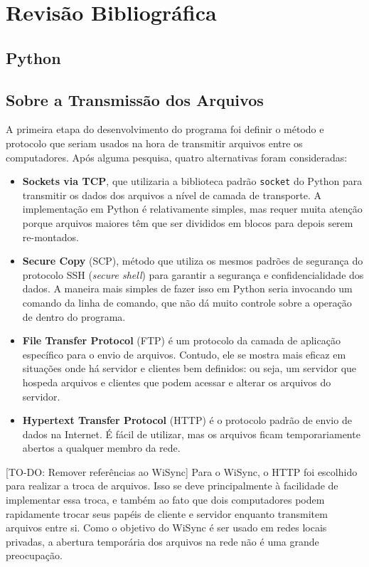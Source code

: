 \chapter{Revisão Bibliográfica}
\label{revisao}

\section{Python}

\section{Sobre a Transmissão dos Arquivos}
A primeira etapa do desenvolvimento do programa foi definir o método e protocolo que seriam usados na hora de transmitir arquivos entre os computadores.
Após alguma pesquisa, quatro alternativas foram consideradas: 
\begin{itemize}
  \item \textbf{Sockets via TCP}\cite{cerf2005protocol}, que utilizaria a biblioteca padrão \texttt{socket} do Python\cite{pythonsockets} para transmitir os dados dos arquivos a nível de camada de transporte. A implementação em Python é relativamente simples, mas requer muita atenção porque arquivos maiores têm que ser divididos em blocos para depois serem re-montados.
  \item \textbf{Secure Copy} (SCP), método que utiliza os mesmos padrões de segurança do protocolo SSH (\textit{secure shell}) para garantir a segurança e confidencialidade dos dados. A maneira mais simples de fazer isso em Python seria invocando um comando da linha de comando, que não dá muito controle sobre a operação de dentro do programa.
  \item \textbf{File Transfer Protocol}\cite{rfc959} (FTP) é um protocolo da camada de aplicação específico para o envio de arquivos. Contudo, ele se mostra mais eficaz em situações onde há servidor e clientes bem definidos: ou seja, um servidor que hospeda arquivos e clientes que podem acessar e alterar os arquivos do servidor.
  \item \textbf{Hypertext Transfer Protocol}\cite{rfc2068} (HTTP) é o protocolo padrão de envio de dados na Internet. É fácil de utilizar, mas os arquivos ficam temporariamente abertos a qualquer membro da rede.
\end{itemize}

[TO-DO: Remover referências ao WiSync]
Para o WiSync, o HTTP foi escolhido para realizar a troca de arquivos.
Isso se deve principalmente à facilidade de implementar essa troca, e também ao fato que dois computadores podem rapidamente trocar seus papéis de cliente e servidor enquanto transmitem arquivos entre si.
Como o objetivo do WiSync é ser usado em redes locais privadas, a abertura temporária dos arquivos na rede não é uma grande preocupação.

